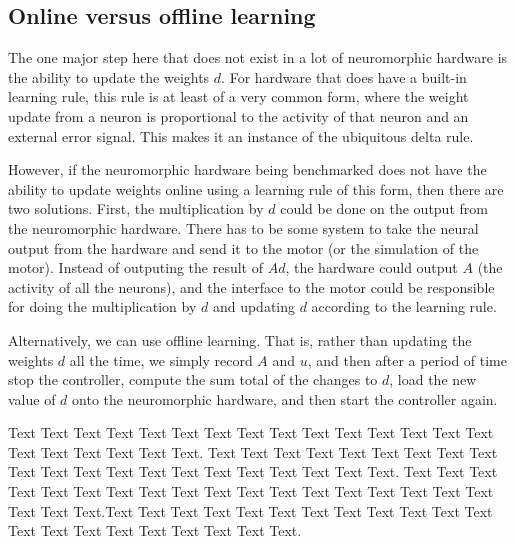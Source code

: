 \documentclass{frontiersSCNS} %
\begin{document}
\subsection{Online versus offline learning}

The one major step here that does not exist in a lot of neuromorphic hardware is
the ability to update the weights $d$.  For hardware that does have a built-in
learning rule, this rule is at least of a very common form, where the weight
update from a neuron is proportional to the activity of that neuron and an
external error signal.  This makes it an instance of the ubiquitous delta rule.

However, if the neuromorphic hardware being benchmarked does not have the
ability to update weights online using a learning rule of this form, then there
are two solutions.  First, the multiplication by $d$ could be done on the
output from the neuromorphic hardware.  There has to be some system to take
the neural output from the hardware and send it to the motor (or the simulation
of the motor).  Instead of outputing the result of $Ad$, the hardware could
output $A$ (the activity of all the neurons), and the interface to the motor
could be responsible for doing the multiplication by $d$ and updating $d$
according to the learning rule.

Alternatively, we can use offline learning.  That is, rather than updating
the weights $d$ all the time, we simply record $A$ and $u$, and then after
a period of time stop the controller, compute the sum total of the changes
to $d$, load the new value of $d$ onto the neuromorphic hardware, and then
start the controller again.








%
%
Text Text Text Text Text Text  Text Text Text Text Text Text Text Text Text  Text Text Text Text Text Text. Text Text Text Text Text Text  Text Text Text Text Text Text Text Text Text  Text Text Text Text Text Text. Text Text Text Text Text Text  Text Text Text Text Text Text Text Text Text  Text Text Text Text Text Text.Text Text Text Text Text Text  Text Text Text Text Text Text Text Text Text  Text Text Text Text Text Text.

\end{document}
